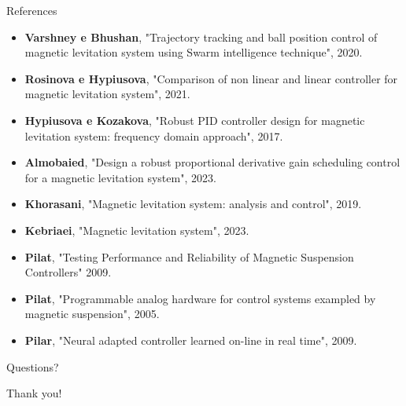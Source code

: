 \documentclass[9pt]{beamer}
\begin{document}
\begin{frame}[allowframebreaks]{References}
    \nocite{*}
    
    \begin{itemize}
    \item \textbf{Varshney e Bhushan}, "Trajectory tracking and ball position control of magnetic levitation system using Swarm intelligence technique", 2020.
    \item \textbf{Rosinova e Hypiusova}, "Comparison of non linear and linear controller for magnetic levitation system", 2021.
    \item \textbf{Hypiusova e Kozakova}, "Robust PID controller design for magnetic levitation system: frequency domain approach", 2017.
    \item \textbf{Almobaied}, "Design a robust proportional derivative gain scheduling control for a magnetic levitation system", 2023.
    \item \textbf{Khorasani}, "Magnetic levitation system: analysis and control", 2019.
    \item \textbf{Kebriaei}, "Magnetic levitation system", 2023.
    \item \textbf{Pilat}, "Testing Performance and Reliability of Magnetic Suspension Controllers" 2009.
    \item \textbf{Pilat}, "Programmable analog hardware for control systems exampled by magnetic suspension", 2005.
    \item \textbf{Pilar}, "Neural adapted controller learned on-line in real time", 2009.
\end{itemize}

\end{frame}

\begin{frame}[standout]
    Questions?
\end{frame}

\begin{frame}[standout]
    Thank you!
\end{frame}
\end{document}
